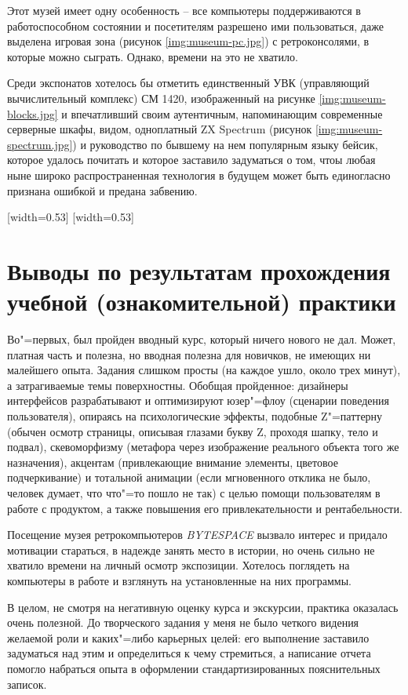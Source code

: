 \documentclass[variant=practice]{bsuir}
\begin{document}
Этот музей имеет одну особенность -- все компьютеры поддерживаются в
работоспособном состоянии и посетителям разрешено ими пользоваться, даже
выделена игровая зона (рисунок \ref{img:museum-pc.jpg}) с ретроконсолями, в
которые можно сыграть. Однако, времени на это не хватило.

Среди экспонатов хотелось бы отметить единственный УВК (управляющий
вычислительный комплекс) СМ 1420, изображенный на рисунке
\ref{img:museum-blocks.jpg} и впечатливший своим аутентичным, напоминающим
современные серверные шкафы, видом, одноплатный ZX Spectrum (рисунок
\ref{img:museum-spectrum.jpg}) и руководство по бывшему на нем популярным языку
бейсик, которое удалось почитать и которое заставило задуматься о том, чтоы
любая ныне широко распространенная технология в будущем может быть единогласно
признана ошибкой и предана забвению.

[width=0.53\textwidth]
[width=0.53\textwidth]

\chapter*{Выводы по результатам прохождения учебной (ознакомительной) практики}

Во"=первых, был пройден вводный курс, который ничего нового не дал. Может,
платная часть и полезна, но вводная полезна для новичков, не имеющих ни
малейшего опыта. Задания слишком просты (на каждое ушло, около трех минут), а
затрагиваемые темы поверхностны. Обобщая пройденное: дизайнеры интерфейсов
разрабатывают и оптимизируют юзер"=флоу (сценарии поведения пользователя),
опираясь на психологические эффекты, подобные Z"=паттерну (обычен осмотр
страницы, описывая глазами букву Z, проходя шапку, тело и подвал), скевоморфизму
(метафора через изображение реального объекта того же назначения), акцентам
(привлекающие внимание элементы, цветовое подчеркивание) и тотальной анимации
(если мгновенного отклика не было, человек думает, что что"=то пошло не так) с
целью помощи пользователям в работе с продуктом, а также повышения его
привлекательности и рентабельности.

Посещение музея ретрокомпьютеров \textit{BYTESPACE} вызвало интерес и придало
мотивации стараться, в надежде занять место в истории, но очень сильно не
хватило времени на личный осмотр экспозиции. Хотелось поглядеть на компьютеры
в работе и взглянуть на установленные на них программы.

В целом, не смотря на негативную оценку курса и экскурсии, практика оказалась
очень полезной. До творческого задания у меня не было четкого видения желаемой
роли и каких"=либо карьерных целей: его выполнение заставило задуматься над этим
и определиться к чему стремиться, а написание отчета помогло набраться опыта в
оформлении стандартизированных пояснительных записок.


\end{document}
